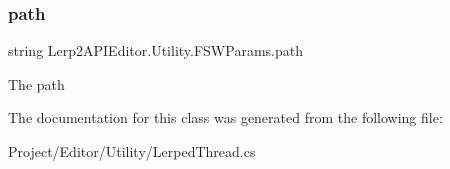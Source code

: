 \subsubsection{\texorpdfstring{path}{path}}
{\footnotesize\ttfamily string Lerp2\+A\+P\+I\+Editor.\+Utility.\+F\+S\+W\+Params.\+path}



The path 



The documentation for this class was generated from the following file\+:\begin{DoxyCompactItemize}
\item 
Project/\+Editor/\+Utility/Lerped\+Thread.\+cs\end{DoxyCompactItemize}
